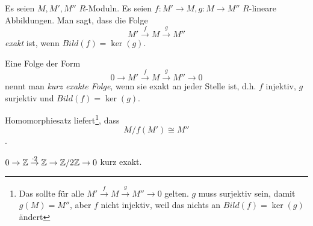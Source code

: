 \documentclass[../main.tex]{subfiles}
\begin{document}
\begin{definition}
    Es seien $M,M',M''$ $R$-Moduln.
    Es seien $f:M'\rightarrow M, g:M\rightarrow M''$ $R$-lineare Abbildungen.
    Man sagt, dass die Folge $$M'\overset{f}{\rightarrow} M \overset{g}{\rightarrow} M''$$
    \emph{exakt} ist, wenn $Bild(f) = \ker(g)$.

    Eine Folge der Form $$0\rightarrow M'\overset{f}{\rightarrow} M \overset{g}{\rightarrow} M'' \rightarrow 0$$ nennt man \emph{kurz exakte Folge}, wenn sie exakt an jeder Stelle ist, d.h. $f$ injektiv, $g$ surjektiv und $Bild(f) = \ker(g)$.

    Homomorphiesatz liefert\footnote{Das sollte für alle $M'\overset{f}{\rightarrow} M \overset{g}{\rightarrow} M'' \rightarrow 0$ gelten. $g$ muss surjektiv sein, damit $g(M) = M''$, aber $f$ nicht injektiv, weil das nichts an $Bild(f)=\ker(g)$ ändert}, dass
    $$M/f(M') \cong M''$$.
\end{definition}
\begin{example*}
    $0\rightarrow \mathbb{Z}\overset{\cdot 2}{\rightarrow} \mathbb{Z} \rightarrow \mathbb{Z}/2\mathbb{Z} \rightarrow 0$ kurz exakt.
\end{example*}
\end{document}
